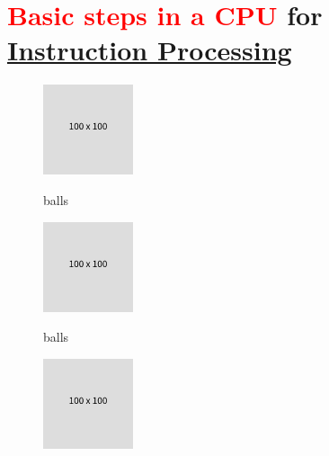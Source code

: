 \documentclass[
  14pt,
  a4paper,
  DIV=11,
  numbers=noendperiod,
  headinclude=true,
  footinclude=true]{scrreprt}
\begin{document}
\section{\texorpdfstring{\textcolor{red}{Basic steps in a CPU} for
\underline{Instruction Processing}}{Basic steps in a CPU for }}\label{basic-steps-in-a-cpu-for}

\begin{figure}

\begin{minipage}{0.30\linewidth}

\includegraphics{index_files/mediabag/FiKGhYhhIWJYiBgWIoaF.png}\end{minipage}%
%
\begin{minipage}{0.70\linewidth}
balls\end{minipage}%

\end{figure}%

\begin{figure}

\begin{minipage}{0.30\linewidth}

\includegraphics{index_files/mediabag/FiKGhYhhIWJYiBgWIoaF.png}\end{minipage}%
%
\begin{minipage}{0.70\linewidth}
balls\end{minipage}%

\end{figure}%

\begin{figure}

\begin{minipage}{0.30\linewidth}

\includegraphics{index_files/mediabag/FiKGhYhhIWJYiBgWIoaF.png}\end{minipage}%
%
\begin{minipage}{0.70\linewidth}

\begin{tcolorbox}[colback=boxbodycol, colframe=boxheadcol, colbacktitle=boxheadcol, title=\textcolor{red}{\underline{\textbf{Execution}}}]

\end{tcolorbox}

\end{minipage}%

\end{figure}%
\end{document}
